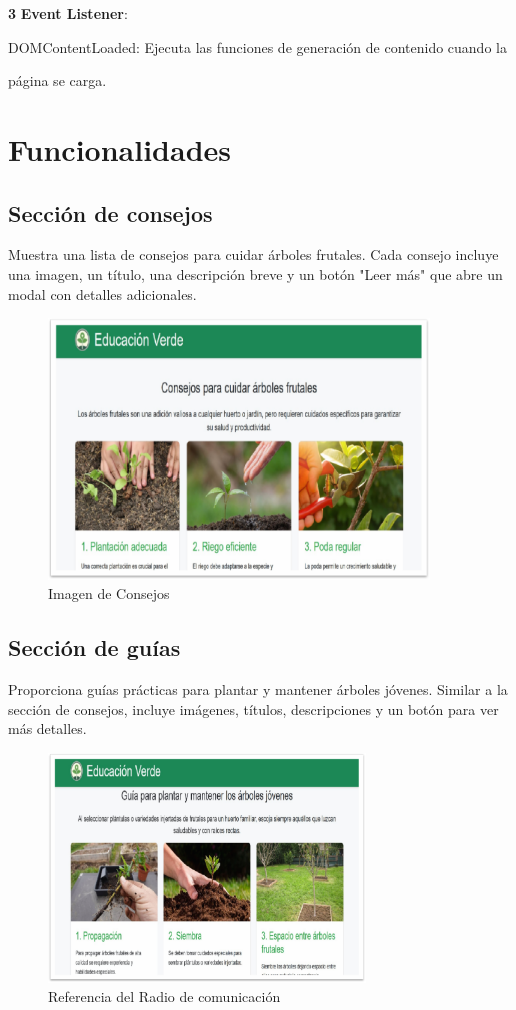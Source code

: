 \documentclass[11pt, a4paper, oneside]{book}
\begin{document}
\textbf{3 }  \textbf{\textbf{Event Listener}}:

 DOMContentLoaded: Ejecuta las funciones de generación de contenido cuando la 
 
 página se carga.



\section{Funcionalidades}

\subsection {Sección de consejos}
Muestra una lista de consejos para cuidar árboles frutales.
Cada consejo incluye una imagen, un título, una descripción breve y un botón "Leer más" que abre un modal con detalles adicionales.
\begin{figure}[H]
\centering
\includegraphics[width=0.9\textwidth]{Pictures/consejos.png}
\caption{Imagen de Consejos}
\end{figure}
\subsection {Sección de guías}
Proporciona guías prácticas para plantar y mantener árboles jóvenes.
Similar a la sección de consejos, incluye imágenes, títulos, descripciones y un botón para ver más detalles.
\begin{figure}[H]
\centering
\includegraphics[width=0.75\textwidth]{Pictures/guias.png}
\caption{Referencia del Radio de comunicación}
\end{figure}
\end{document}
